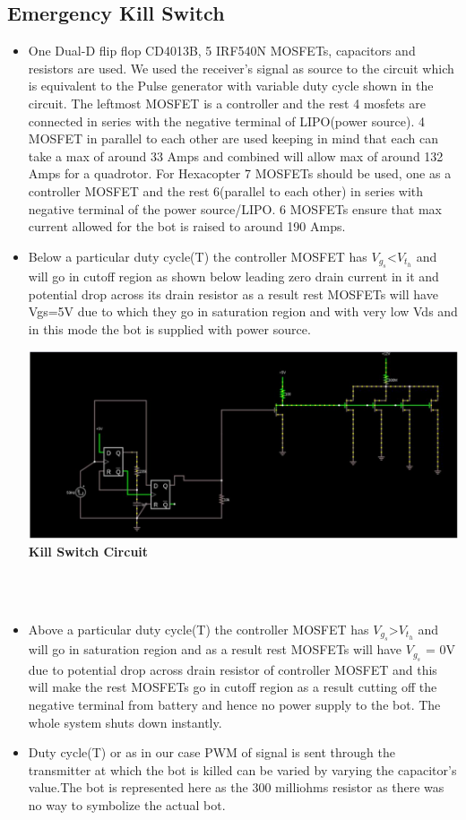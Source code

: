 \documentclass[12pt]{article}
\begin{document}
	\subsection{Emergency Kill Switch}
\begin{itemize}
\item One Dual-D flip flop CD4013B, 5 IRF540N MOSFETs, capacitors and resistors are used. We used the receiver’s signal as source to the circuit which is equivalent to the Pulse generator with variable duty cycle shown in the circuit. The leftmost MOSFET is a controller and the rest 4  mosfets  are connected in series with the negative terminal of LIPO(power source). 4 MOSFET in parallel to each other are used  keeping in mind that each can take a max of around 33 Amps and combined will allow max of around 132 Amps for a quadrotor. For Hexacopter 7 MOSFETs should be used, one as a controller MOSFET and the rest 6(parallel to each other) in series with negative terminal of the power source/LIPO. 6 MOSFETs ensure that max current allowed for the bot is raised to around 190 Amps.  
\item Below a particular duty cycle(T) the controller MOSFET has $V_g_s$<$V_t_h$ and will go in cutoff region as shown below leading zero drain current in it and potential drop across its drain resistor as a result rest MOSFETs will have Vgs=5V due to which they go in saturation region and with very low Vds and in this mode the bot is supplied with power source.\\
\begin{center}
\includegraphics[scale = 0.4]{kill} \\
\textbf{Kill Switch Circuit}\\ \\
\end{center}
\\
\item Above a particular duty cycle(T) the controller MOSFET has $V_g_s$>$V_t_h$ and will go in saturation region and as a result rest MOSFETs will have $V_g_s$ = 0V due to potential drop across drain resistor of controller MOSFET and this will make the rest MOSFETs go in cutoff region as a result cutting off the negative terminal from battery and hence no power supply to the bot. The whole system shuts down instantly.
\item Duty cycle(T) or as in our case PWM of signal  is sent through the transmitter at which the bot is killed can be varied by varying the capacitor’s value.The bot is represented here as the 300 milliohms resistor as there was no way to symbolize the actual bot.
\end{itemize}
\end{document}
